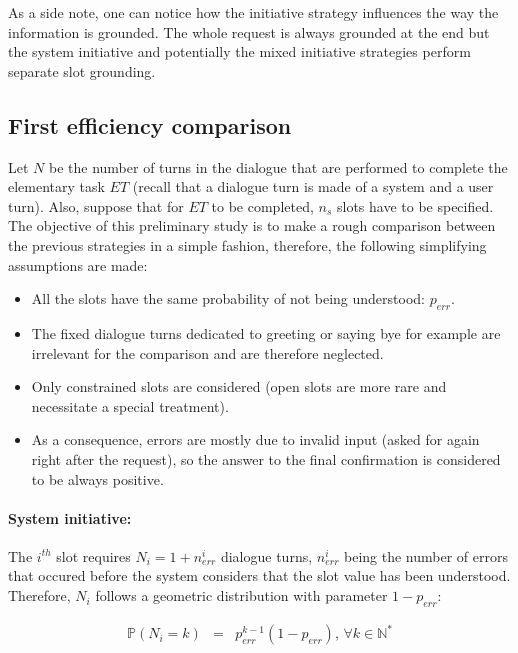                 As a side note, one can notice how the initiative strategy influences the way the information is grounded. The whole request is always grounded at the end but the system initiative and potentially the mixed initiative strategies perform separate slot grounding.
	
	\subsection{First efficiency comparison}
	
		Let $N$ be the number of turns in the dialogue that are performed to complete the elementary task $ET$ (recall that a dialogue turn is made of a system and a user turn). Also, suppose that for $ET$ to be completed, $n_s$ slots have to be specified. The objective of this preliminary study is to make a rough comparison between the previous strategies in a simple fashion, therefore, the following simplifying assumptions are made:
		
		\begin{itemize}
			\item All the slots have the same probability of not being understood: $p_{err}$.
			\item The fixed dialogue turns dedicated to greeting or saying bye for example are irrelevant for the comparison and are therefore neglected.
			\item Only constrained slots are considered (open slots are more rare and necessitate a special treatment).
			\item As a consequence, errors are mostly due to invalid input (asked for again right after the request), so the answer to the final confirmation is considered to be always positive.
		\end{itemize}

                \paragraph{System initiative:} The $i^{th}$ slot requires $N_i = 1 + n^i_{err}$ dialogue turns, $n^i_{err}$ being the number of errors that occured before the system considers that the slot value has been understood. Therefore, $N_i$ follows a geometric distribution with parameter $1-p_{err}$:

                     \begin{eqnarray}
                       \mathbb{P} (N_i = k) & = & p_{err}^{k-1} (1-p_{err}) \text{,  } \forall k \in \mathbb{N}^*
                     \end{eqnarray}

